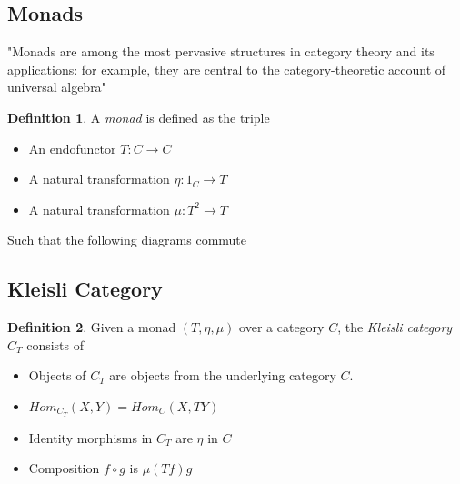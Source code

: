 \documentclass[a4paper,10pt]{article}
\theoremstyle{definition}
\newtheorem{definition}{Definition}[section]
\begin{document}
\subsection{Monads}
"Monads are among the most pervasive structures in category theory
and its applications: for example, they are central to the category-theoretic account of universal algebra"
\cite{mac2013categories}
\begin{definition}
    A \textit{monad} is defined as the triple
    \begin{itemize}
        \item An endofunctor $T : C \rightarrow C$
        \item A natural transformation $\eta : 1_{C} \rightarrow T$
        \item A natural transformation $\mu : T^2 \rightarrow T$
    \end{itemize}
    Such that the following diagrams commute
    \begin{center}
        \quad
    \end{center}
\end{definition}

\subsection{Kleisli Category}
\begin{definition}
    Given a monad $(T,\eta,\mu)$ over a category $C$,
    the \textit{Kleisli category} $C_T$ consists of
    \begin{itemize}
        \item Objects of $C_T$ are objects from the underlying category $C$.
        \item $Hom_{C_T}(X,Y) = Hom_C (X,TY)$
        \item Identity morphisms in $C_T$ are $\eta$ in $C$
        \item Composition $f \circ g$ is $\mu(Tf)g$
    \end{itemize}
\end{definition}
\end{document}

